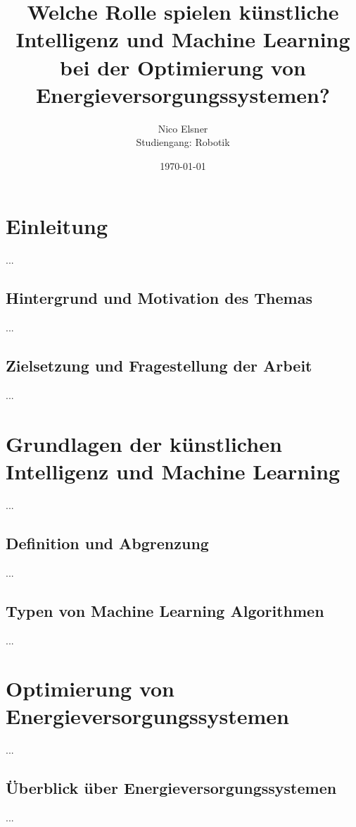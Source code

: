 \documentclass[
11pt, 
a4paper,
DIV = 14,
twoside,
twocolumn, %
parskip =half, %
headsepline, %
openright, %
]{scrreprt}
\begin{document}
	
	\title{Welche Rolle spielen künstliche Intelligenz und Machine Learning bei der Optimierung von Energieversorgungssystemen?}
	\author{Nico Elsner\\
		Studiengang: Robotik}
	\date{\today}
	\maketitle
	\tableofcontents
	\thispagestyle{empty}


	\chapter{Einleitung}
	\setcounter{page}{1}
	...
	\section{Hintergrund und Motivation des Themas}
	...
	\section{Zielsetzung und Fragestellung der Arbeit}
	...


	\chapter{Grundlagen der künstlichen Intelligenz und Machine Learning}
	...
	\section{Definition und Abgrenzung}
	...
	\section{Typen von Machine Learning Algorithmen}
	...


	\chapter{Optimierung von Energieversorgungssystemen}
	...
	\section{Überblick über Energieversorgungssystemen}
	...
\end{document}
